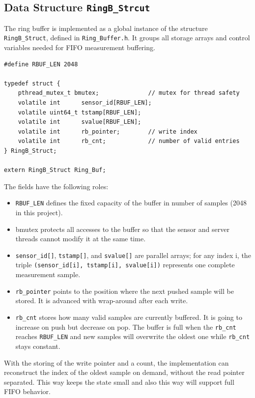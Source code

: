 \subsection{Data Structure \texttt{RingB\_Strcut}}
The ring buffer is implemented as a global instance of the structure \texttt{RingB\_Struct}, defined in \texttt{Ring\_Buffer.h}. It groups all storage arrays and control variables needed for FIFO measurement buffering.

\begin{verbatim}
#define RBUF_LEN 2048

typedef struct {
    pthread_mutex_t bmutex;              // mutex for thread safety
    volatile int      sensor_id[RBUF_LEN];
    volatile uint64_t tstamp[RBUF_LEN];
    volatile int      svalue[RBUF_LEN];
    volatile int      rb_pointer;        // write index
    volatile int      rb_cnt;            // number of valid entries
} RingB_Struct;

extern RingB_Struct Ring_Buf;
\end{verbatim}

The fields have the following roles:
\begin{itemize}
\item \texttt{RBUF\_LEN} defines the fixed capacity of the buffer in number of samples (2048 in this project).
\item bmutex protects all accesses to the buffer so that the sensor and server threads cannot modify it at the same time.
\item \texttt{sensor\_id[]}, \texttt{tstamp[]}, and \texttt{svalue[]} are parallel arrays; for any index i, the triple \texttt{(sensor\_id[i], tstamp[i], svalue[i])} represents one complete measurement sample.
\item \texttt{rb\_pointer} points to the position where the next pushed sample will be stored. It is advanced with wrap-around after each write.
\item \texttt{rb\_cnt} stores how many valid samples are currently buffered. It is going to increase on push but decrease on pop. The buffer is full when the \texttt{rb\_cnt} reaches \texttt{RBUF\_LEN} and new samples will overwrite the oldest one while \texttt{rb\_cnt} stays constant.
\end{itemize}
With the storing of the write pointer and a count, the implementation can reconstruct the index of the oldest sample on demand, without the read pointer separated.  This way keeps the state small and also this way will support full FIFO behavior.

